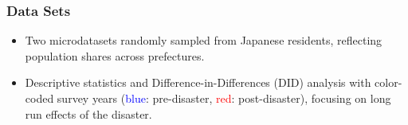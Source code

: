 \documentclass[serif, aspectratio=169]{beamer}
\begin{document}
\begin{frame}[label=data]
\frametitle{Data Sets}









\begin{itemize}
    \item Two microdatasets randomly sampled from Japanese residents, reflecting population shares across prefectures.
    \item Descriptive statistics and Difference-in-Differences (DID) analysis with color-coded survey years (\textcolor{blue}{blue}: pre-disaster, \textcolor{red}{red}: post-disaster), focusing on long run effects of the disaster.
\end{itemize}


\end{frame}
\end{document}
